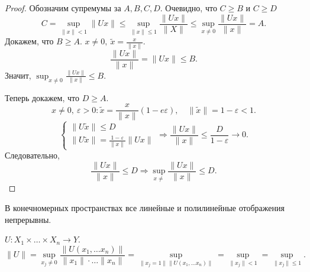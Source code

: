 \begin{proof}
     Обозначим супремумы за $ A, B, C, D$.
     Очевидно, что $ C \ge B$ и $  C \ge D$
     $$ C = \sup_{\|  x  \| < 1} \| Ux \| \le \sup_{\| x \| \le 1} \frac{\| Ux \| }{\| X \| } \le \sup _{x  \ne 0} \frac{\| Ux \| }{\| x \|  } = A.$$
     Докажем, что $ B \ge A$. $ x \ne 0, ~ \tilde x = \frac{x}{\| x \| }$. 
     \[
	 \frac{\| Ux \| }{\| x \| } = \| Ux \|  \le  B
     .\] 
     Значит, $ \sup_{x\ne 0} \frac{\| Ux \| }{\| x \| } \le B$.

     Теперь докажем, что  $ D \ge  A$.
     \[
	 x \ne 0, ~ \varepsilon >0\colon \tilde x = \frac{x}{\|  x \| }(1 -e \varepsilon ), \quad \|\tilde x \|  = 1 - \varepsilon  < 1
     .\] 
     \[
    \begin{cases}
        \| U\tilde x \| \le  D\\
	\| U\tilde x \|  = \frac{1- \varepsilon }{\|  x \| } \| Ux \| 
    \end{cases} 
\Longrightarrow \frac{\| Ux \| }{\| x \|}  \le \frac{D}{1 - \varepsilon } \to  0
     .\] 
     Следовательно, 
     \[
	 \frac{\|  Ux \| }{\| x \| } \le D \Longrightarrow \sup_{x \ne } \frac{\| Ux \| }{\| x \| } \le D
     .\] 
\end{proof}
\begin{rem}
    В конечномерных пространствах все линейные и полилинейные отображения непрерывны. 
\end{rem}
\begin{thm}
    $ U: X_1 \times \ldots \times X_n \to  Y $. \[
	\| U \|  = \sup_{x_j \ne 0} \frac{\| U(x_1, \ldots x_n)\|}{\| x_1 \| \cdot  \ldots \| x_n \| }   = \sup _{ \| x_j=1 \| \| U(x_1, \ldots x_n) \|  }  = \sup_{\|  x_j  \|  < 1} = \sup_{\| x_j \|  \le 1}
    .\]  
\end{thm}


